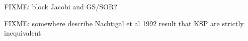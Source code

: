 FIXME:  block Jacobi and GS/SOR?

FIXME: somewhere describe Nachtigal et al 1992 result that KSP are strictly inequivalent

\begin{comment}
> Hi all,
>
> Is weighted Jacobi available as a preconditioner ? I can't find it in the
> list of preconditioners. If not, what is the rationale between this choice
> ? It is pretty straightforward to code, so if it is not available I can do
> it without problem I guess, but I am just wondering. In the matrix-free
> case where SOR is not available by default, it may be better than pure
> Jacobi, and much easier to parallelize than SOR.
>
>   Timothee Nicolas

I believe what you are looking for is defined by the following options
  -ksp_type richardson
  -ksp_richardson_scale <value>
  -pc_type jacobi

Thanks,
  Dave May
\end{comment}


